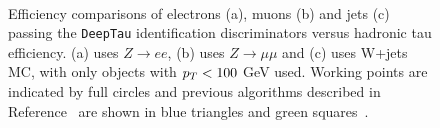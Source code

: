 \begin{figure}[!hbtp]
\centering
     \\
\caption{Efficiency comparisons of electrons (a), muons (b) and jets (c) passing the \texttt{DeepTau} identification discriminators versus hadronic tau efficiency. (a) uses $Z\rightarrow ee$, (b) uses $Z\rightarrow \mu\mu$ and (c) uses W+jets MC, with only objects with $p_{T}<100$ GeV used. Working points are indicated by full circles and previous algorithms described in Reference~\cite{CMS:2018jrd} are shown in blue triangles and green squares~\cite{CMS:2022prd}.}
\label{fig:deeptau_misid}
\end{figure}